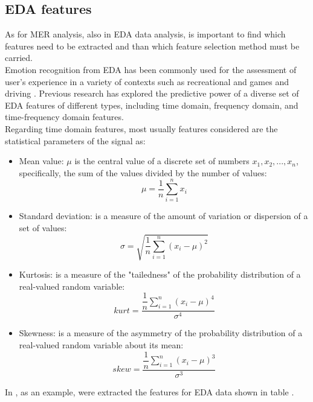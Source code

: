 \subsection{EDA features}
As for MER analysis, also in EDA data analysis, is important to find which features need to be extracted and than which feature selection method must be carried.
\\ \indent
Emotion recognition from EDA has been commonly used for the assessment of user's experience in a variety of contexts such as recreational and games \cite{drachen2010correlation} and driving \cite{healey2005detecting}. Previous research has explored the predictive power of a diverse set of EDA features of different types, including time domain, frequency domain, and time-frequency domain features.
\\ \indent
Regarding time domain features, most usually features considered are the statistical parameters of the signal as:
\begin{itemize}
	\item Mean value: $\mu$ is the central value of a discrete set of numbers $x_1,x_2,...,x_n$, specifically, the sum of the values divided by the number of values:
		\begin{equation}
		\mu=\dfrac{1}{n} \sum_{i=1}^{n}{x_i}
		\end{equation}
	\item Standard deviation:  is a measure of the amount of variation or dispersion of a set of values:
		\begin{equation}
		\sigma=\sqrt{\dfrac{1}{n}\sum_{i=1}^{n}({x_i-\mu})^2}
		\end{equation}
	\item Kurtosis: is a measure of the "tailedness" of the probability distribution of a real-valued random variable:
		\begin{equation}
		kurt=\dfrac{\dfrac{1}{n} \sum_{i=1}^{n}{(x_i-\mu)^4}}{\sigma^4}
		\end{equation}
	\item Skewness: is a measure of the asymmetry of the probability distribution of a real-valued random variable about its mean:
		\begin{equation}
		skew=\dfrac{\dfrac{1}{n} \sum_{i=1}^{n}{(x_i-\mu)^3}}{\sigma^3}
		\end{equation}
\end{itemize}
In \cite{shukla2019feature}, as an example, were extracted the features for EDA data shown in table .
